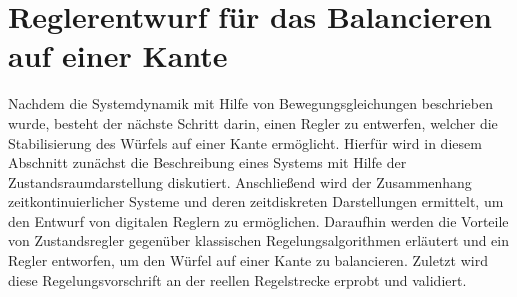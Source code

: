 \ifx\FORMAT\undefined


\fi

\chapter{Reglerentwurf für das Balancieren auf einer Kante}\label{chapter_RT_Edge}
Nachdem die Systemdynamik mit Hilfe von Bewegungsgleichungen beschrieben wurde, besteht der nächste Schritt darin, einen Regler zu entwerfen, welcher die Stabilisierung des Würfels auf einer Kante ermöglicht. Hierfür wird in diesem Abschnitt zunächst die Beschreibung eines Systems mit Hilfe der Zustandsraumdarstellung diskutiert. Anschließend wird der Zusammenhang zeitkontinuierlicher Systeme und deren zeitdiskreten Darstellungen ermittelt, um den Entwurf von digitalen Reglern zu ermöglichen. Daraufhin werden die Vorteile von Zustandsregler gegenüber klassischen Regelungsalgorithmen erläutert und ein Regler entworfen, um den Würfel auf einer Kante zu balancieren. Zuletzt wird diese Regelungsvorschrift an der reellen Regelstrecke erprobt und validiert.

\newpage

\newpage

\newpage

\newpage


\ifx\FORMAT\undefined

\fi

